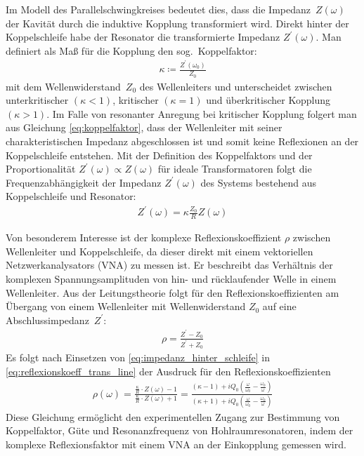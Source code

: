 Im Modell des Parallelschwingkreises bedeutet dies, dass die Impedanz~$Z(\omega)$ der Kavität durch die induktive Kopplung transformiert wird.
Direkt hinter der Koppelschleife habe der Resonator die transformierte Impedanz $Z^\prime(\omega)$.
Man definiert als Maß für die Kopplung den sog.\ Koppelfaktor:
\begin{align}
  \kappa \coloneqq \frac{Z^\prime(\omega_0)}{Z_0}
  \label{eq:koppelfaktor}
\end{align}
mit dem Wellenwiderstand~$Z_0$ des Wellenleiters und unterscheidet zwischen unterkritischer $(\kappa < 1)$, kritischer $(\kappa = 1)$ und überkritischer Kopplung $(\kappa > 1)$.
Im Falle von resonanter Anregung bei kritischer Kopplung folgert man aus Gleichung \eqref{eq:koppelfaktor}, dass der Wellenleiter mit seiner charakteristischen Impedanz abgeschlossen ist und somit keine Reflexionen an der Koppelschleife entstehen.
Mit der Definition des Koppelfaktors und der Proportionalität $Z^\prime(\omega) \propto Z(\omega)$ für ideale Transformatoren folgt die Frequenzabhängigkeit der Impedanz $Z^\prime(\omega)$ des Systems bestehend aus Koppelschleife und Resonator:
\begin{align}
  Z^\prime(\omega) = \kappa \frac{Z_0}{R} Z(\omega)
  \label{eq:impedanz_hinter_schleife}
\end{align}

Von besonderem Interesse ist der komplexe Reflexionskoeffizient $\rho$ zwischen Wellenleiter und Koppelschleife, da dieser direkt mit einem vektoriellen Netzwerkanalysators (VNA) zu messen ist.
Er beschreibt das Verhältnis der komplexen Spannungsamplituden von hin- und rücklaufender Welle in einem Wellenleiter.
Aus der Leitungstheorie \cite[S.\ 57]{pozar} folgt für den Reflexionskoeffizienten am Übergang von einem Wellenleiter mit Wellenwiderstand $Z_0$ auf eine Abschlussimpedanz~$Z^\prime$:
\begin{align}
  \rho = \frac{Z^\prime - Z_0}{Z^\prime + Z_0}
  \label{eq:reflexionskoeff_trans_line}
\end{align}
Es folgt nach Einsetzen von \eqref{eq:impedanz_hinter_schleife} in \eqref{eq:reflexionskoeff_trans_line} der Ausdruck für den Reflexionskoeffizienten 
\begin{align}
  \rho(\omega) = \frac{\frac{\kappa}{R} \cdot Z(\omega) - 1}{\frac{\kappa}{R} \cdot Z(\omega) + 1} = \frac{(\kappa - 1) + i  Q_0 \left( \frac{\omega}{\omega_0}  - \frac{\omega_0}{\omega}\right)}{\left( \kappa + 1 \right) + i  Q_0 \left( \frac{\omega}{\omega_0}  - \frac{\omega_0}{\omega}\right)}
\end{align}
Diese Gleichung ermöglicht den experimentellen Zugang zur Bestimmung von Koppelfaktor, Güte und Resonanzfrequenz von Hohlraumresonatoren, indem der komplexe Reflexionsfaktor mit einem VNA an der Einkopplung gemessen wird.


